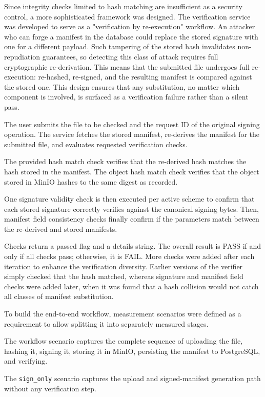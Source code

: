 \documentclass[12pt,a4paper]{article}
\begin{document}
Since integrity checks limited to hash matching are insufficient as a security control, a more sophisticated framework was designed. The verification service was developed to serve as a "verification by re-execution" workflow. An attacker who can forge a manifest in the database could replace the stored signature with one for a different payload. Such tampering of the stored hash invalidates non-repudiation guarantees, so detecting this class of attack requires full cryptographic re-derivation. This means that the submitted file undergoes full re-execution: re-hashed, re-signed, and the resulting manifest is compared against the stored one. This design ensures that any substitution, no matter which component is involved, is surfaced as a verification failure rather than a silent pass.

The user submits the file to be checked and the request ID of the original signing operation. The service fetches the stored manifest, re-derives the manifest for the submitted file, and evaluates requested verification checks.

The provided hash match check verifies that the re-derived hash matches the hash stored in the manifest. The object hash match check verifies that the object stored in MinIO hashes to the same digest as recorded.

One signature validity check is then executed per active scheme to confirm that each stored signature correctly verifies against the canonical signing bytes. Then, manifest field consistency checks finally confirm if the parameters match between the re-derived and stored manifests.

Checks return a passed flag and a details string. The overall result is PASS if and only if all checks pass; otherwise, it is FAIL. More checks were added after each iteration to enhance the verification diversity. Earlier versions of the verifier simply checked that the hash matched, whereas signature and manifest field checks were added later, when it was found that a hash collision would not catch all classes of manifest substitution.

To build the end-to-end workflow, measurement scenarios were defined as a requirement to allow splitting it into separately measured stages.

The workflow scenario captures the complete sequence of uploading the file, hashing it, signing it, storing it in MinIO, persisting the manifest to PostgreSQL, and verifying.

The \texttt{sign\_only} scenario captures the upload and signed-manifest generation path without any verification step.
\end{document}
